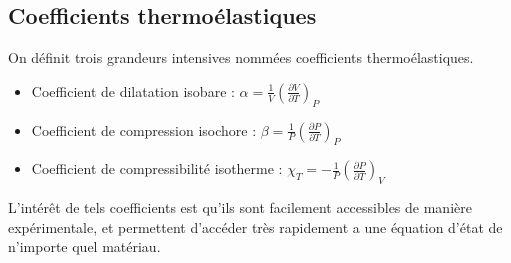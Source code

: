 \subsection{Coefficients thermoélastiques}
\begin{defi}
    On définit trois grandeurs intensives nommées coefficients thermoélastiques.\\
    \begin{itemize}
        \item Coefficient de dilatation isobare : $\alpha = \displaystyle \frac{1}{V}\left(\frac{\partial V}{\partial T}\right)_P$
        \item Coefficient de compression isochore : $\beta = \displaystyle \frac{1}{P}\left(\frac{\partial P}{\partial T}\right)_P $
        \item Coefficient de compressibilité isotherme : $\chi_T = \displaystyle -\frac{1}{P}\left(\frac{\partial P}{\partial T}\right)_V$
    \end{itemize} 
\end{defi}
L'intérêt de tels coefficients est qu'ils sont facilement accessibles de manière expérimentale,
et permettent d'accéder très rapidement a une équation d'état de n'importe quel matériau.
